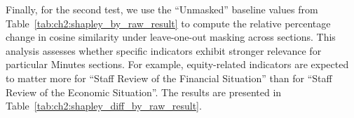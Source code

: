 
Finally, for the second test, we use the ``Unmasked'' baseline values from Table~\ref{tab:ch2:shapley_by_raw_result} to compute the relative percentage change in cosine similarity under leave-one-out masking across sections. This analysis assesses whether specific indicators exhibit stronger relevance for particular Minutes sections. For example, equity-related indicators are expected to matter more for ``Staff Review of the Financial Situation'' than for ``Staff Review of the Economic Situation''. The results are presented in Table~\ref{tab:ch2:shapley_diff_by_raw_result}.

